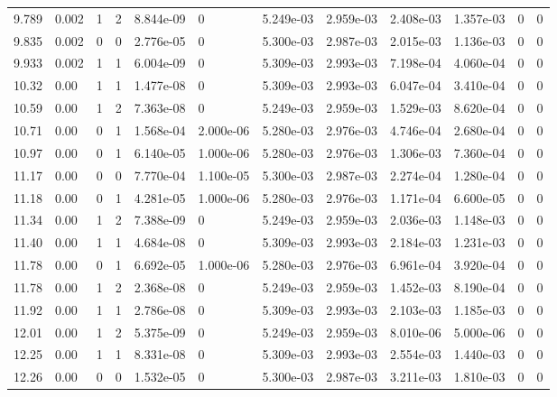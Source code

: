 \documentclass[preview]{standalone}
\begin{document}
{{{\begin{tabular}{L{1.2cm}C{1.2cm} C{0.3cm}C{0.5cm} C{1.4cm}C{1.4cm} C{1.4cm}C{1.4cm} C{1.6cm}C{1.6cm} C{1.6cm}C{1.6cm}}
  9.789  &  0.002  & 1     &  2 &  8.844e-09  & 0  &  5.249e-03&   2.959e-03& 2.408e-03 & 1.357e-03   &  0 & 0  \\ 
  9.835  &  0.002  & 0     &  0 &  2.776e-05  & 0  &  5.300e-03&   2.987e-03& 2.015e-03 & 1.136e-03   &  0 & 0  \\ 
  9.933  &  0.002  & 1     &  1 &  6.004e-09  & 0  &  5.309e-03&   2.993e-03& 7.198e-04 & 4.060e-04   &  0 & 0  \\ 
  10.32  &  0.00  & 1     &  1 &  1.477e-08  & 0  &  5.309e-03&   2.993e-03& 6.047e-04 & 3.410e-04   &  0 & 0  \\ 
  10.59  &  0.00  & 1     &  2 &  7.363e-08  & 0  &  5.249e-03&   2.959e-03& 1.529e-03 & 8.620e-04   &  0 & 0  \\ 
  10.71  &  0.00  & 0     &  1 &  1.568e-04  & 2.000e-06  &  5.280e-03&   2.976e-03& 4.746e-04 & 2.680e-04   &  0 & 0  \\ 
  10.97  &  0.00  & 0     &  1 &  6.140e-05  & 1.000e-06  &  5.280e-03&   2.976e-03& 1.306e-03 & 7.360e-04   &  0 & 0  \\ 
  11.17  &  0.00  & 0     &  0 &  7.770e-04  & 1.100e-05  &  5.300e-03&   2.987e-03& 2.274e-04 & 1.280e-04   &  0 & 0  \\ 
  11.18  &  0.00  & 0     &  1 &  4.281e-05  & 1.000e-06  &  5.280e-03&   2.976e-03& 1.171e-04 & 6.600e-05   &  0 & 0  \\ 
  11.34  &  0.00  & 1     &  2 &  7.388e-09  & 0  &  5.249e-03&   2.959e-03& 2.036e-03 & 1.148e-03   &  0 & 0  \\ 
  11.40  &  0.00  & 1     &  1 &  4.684e-08  & 0  &  5.309e-03&   2.993e-03& 2.184e-03 & 1.231e-03   &  0 & 0  \\ 
  11.78  &  0.00  & 0     &  1 &  6.692e-05  & 1.000e-06  &  5.280e-03&   2.976e-03& 6.961e-04 & 3.920e-04   &  0 & 0  \\ 
  11.78  &  0.00  & 1     &  2 &  2.368e-08  & 0  &  5.249e-03&   2.959e-03& 1.452e-03 & 8.190e-04   &  0 & 0  \\ 
  11.92  &  0.00  & 1     &  1 &  2.786e-08  & 0  &  5.309e-03&   2.993e-03& 2.103e-03 & 1.185e-03   &  0 & 0  \\ 
  12.01  &  0.00  & 1     &  2 &  5.375e-09  & 0  &  5.249e-03&   2.959e-03& 8.010e-06 & 5.000e-06   &  0 & 0  \\ 
  12.25  &  0.00  & 1     &  1 &  8.331e-08  & 0  &  5.309e-03&   2.993e-03& 2.554e-03 & 1.440e-03   &  0 & 0  \\ 
  12.26  &  0.00  & 0     &  0 &  1.532e-05  & 0  &  5.300e-03&   2.987e-03& 3.211e-03 & 1.810e-03   &  0 & 0  \\ 

\end{tabular}}}}
\end{document}
